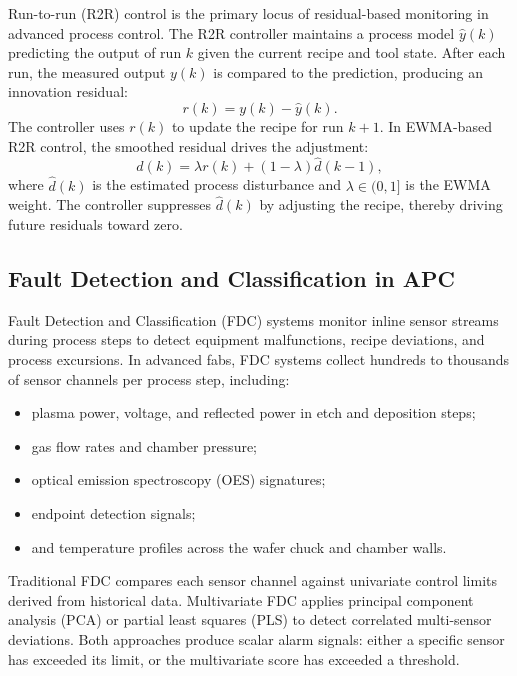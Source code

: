 \documentclass[11pt,letterpaper]{article}
\theoremstyle{scresult}
\begin{document}
Run-to-run (R2R) control is the primary locus of residual-based monitoring in
advanced process control. The R2R controller maintains a process model
$\hat{y}(k)$ predicting the output of run $k$ given the current recipe and tool
state. After each run, the measured output $y(k)$ is compared to the prediction,
producing an innovation residual:
\begin{equation}
  r(k) = y(k) - \hat{y}(k).
  \label{eq:r2r-residual}
\end{equation}
The controller uses $r(k)$ to update the recipe for run $k+1$. In EWMA-based
R2R control, the smoothed residual drives the adjustment:
\begin{equation}
  \hat{d}(k) = \lambda r(k) + (1 - \lambda)\hat{d}(k-1),
  \label{eq:ewma}
\end{equation}
where $\hat{d}(k)$ is the estimated process disturbance and $\lambda \in (0,1]$
is the EWMA weight. The controller suppresses $\hat{d}(k)$ by adjusting the
recipe, thereby driving future residuals toward zero.

\subsection{Fault Detection and Classification in APC}

Fault Detection and Classification (FDC) systems monitor inline sensor streams
during process steps to detect equipment malfunctions, recipe deviations, and
process excursions. In advanced fabs, FDC systems collect hundreds to thousands
of sensor channels per process step, including:
\begin{itemize}
  \item plasma power, voltage, and reflected power in etch and deposition steps;
  \item gas flow rates and chamber pressure;
  \item optical emission spectroscopy (OES) signatures;
  \item endpoint detection signals;
  \item and temperature profiles across the wafer chuck and chamber walls.
\end{itemize}

Traditional FDC compares each sensor channel against univariate control limits
derived from historical data. Multivariate FDC applies principal component
analysis (PCA) or partial least squares (PLS) to detect correlated
multi-sensor deviations. Both approaches produce scalar alarm signals: either
a specific sensor has exceeded its limit, or the multivariate score has exceeded
a threshold.
\end{document}
